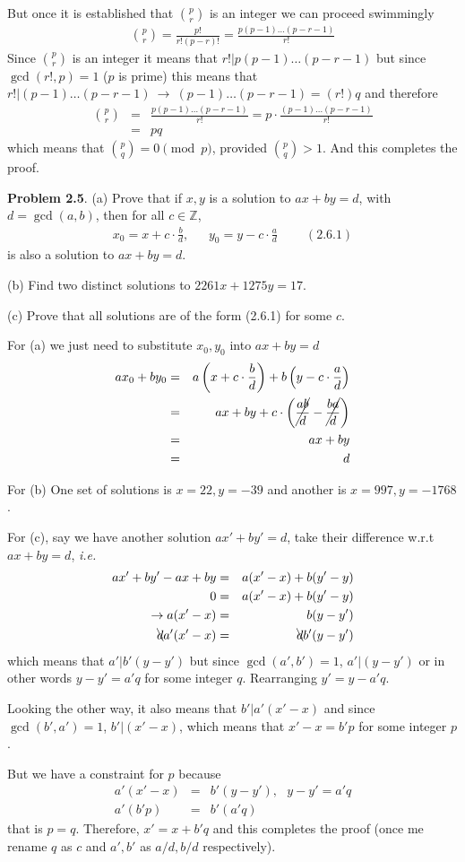 \documentclass[aps,preprint,preprintnumbers,nofootinbib,showpacs,prd]{revtex4-1}
\newcommand{\ie}{{\it i.e.} }
\newcommand{\nbea}{\begin{eqnarray*}}
\newcommand{\neea}{\end{eqnarray*}}
\begin{document}
But once it is established that $\binom{p}{r}$ is an integer we can proceed swimmingly
%
\nbea
\binom{p}{r} = \frac{p!}{r!(p-r)!} = \frac{p (p-1) \dots (p-r-1)}{r!}
\neea
%
Since $\binom{p}{r}$ is an integer it means that $r!|p (p-1) \dots (p-r-1)$ but since $\gcd(r!, p) = 1$ ($p$ is prime) this means that $r!|(p-1) \dots (p-r-1)~\to ~ (p-1) \dots (p-r-1) = (r!) q$ and therefore
%
\nbea
\binom{p}{r} & = & \frac{p (p-1) \dots (p-r-1)}{r!} = p \cdot \frac{(p-1) \dots (p-r-1)}{r!} \\
& = & p q
\neea
%
which means that $\binom{p}{q} = 0 \pmod{p}$, provided $\binom{p}{q} > 1$. And this completes the proof.

{\bf Problem 2.5}. (a) Prove that if $x, y$ is a solution to $ax+by = d$, with $d = \gcd(a, b)$,
then for all $c \in \mathbb{Z}$,
%
\nbea
x_0 = x + c \cdot \frac{b}{d}, ~~~~~~~ y_0 = y - c \cdot \frac{a}{d} ~~~~~~~~~~(2.6.1)
\neea
%
is also a solution to $ax + by = d$.

(b) Find two distinct solutions to $2261x + 1275y = 17$.

(c) Prove that all solutions are of the form (2.6.1) for some $c$.

For (a) we just need to substitute $x_0, y_0$ into $ax+by = d$
%
\nbea
ax_0+by_0 & = & a \left( x + c \cdot \frac{b}{d} \right ) + b \left( y - c \cdot \frac{a}{d} \right ) \\
& = & ax + by + c \cdot \left ( \cancel{\frac{ab}{d}} - \cancel{ \frac{ba}{d}} \right ) \\
& = & ax + by \\
& = & d
\neea
%

For (b) One set of solutions is $x = 22, y = -39$ and another is $x = 997, y = -1768$.

For (c), say we have another solution $ax'+by' = d$, take their difference w.r.t $ax+by = d$, \ie 
%
\nbea
ax'+by' - ax+by & = & a(x' - x) + b(y' - y) \\
0 & = & a(x' - x) + b(y' - y) \\
\to a(x' - x) & = & b(y - y') \\
\bcancel{d}a'(x' - x) & = & \bcancel{d}b'(y - y')
\neea
%
which means that $a'|b'(y-y')$ but since $\gcd(a',b') = 1$, $a'|(y-y')$ or in other words $y - y' = a' q$ for some integer $q$. Rearranging $y' = y - a'q$.

Looking the other way, it also means that $b'|a'(x'-x)$ and since $\gcd(b',a') = 1$, $b'|(x'-x)$, which means that $x'-x = b'p$ for some integer $p$.

But we have a constraint for $p$ because 
%
\nbea
a'(x' - x) & = & b'(y - y'), ~~~ y - y' = a' q\\
a'(b'p) & = & b'(a'q)
\neea
%
that is $p=q$. Therefore, $x' = x + b'q$ and this completes the proof (once me rename $q$ as $c$ and $a', b'$ as $a/d, b/d$ respectively).
\end{document}
